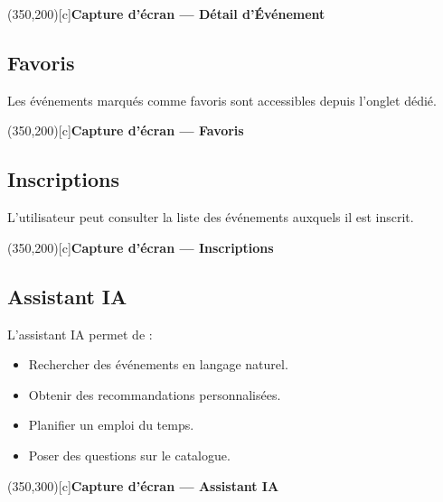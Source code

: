 \documentclass[12pt,a4paper]{article}
\begin{document}
\vspace{0.5cm}
\begin{center}
    \framebox(350,200)[c]{\textbf{Capture d'écran --- Détail d'Événement}}
\end{center}
\vspace{0.3cm}

\subsection{Favoris}

Les événements marqués comme favoris sont accessibles depuis l'onglet dédié.

\vspace{0.5cm}
\begin{center}
    \framebox(350,200)[c]{\textbf{Capture d'écran --- Favoris}}
\end{center}
\vspace{0.3cm}

\subsection{Inscriptions}

L'utilisateur peut consulter la liste des événements auxquels il est inscrit.

\vspace{0.5cm}
\begin{center}
    \framebox(350,200)[c]{\textbf{Capture d'écran --- Inscriptions}}
\end{center}
\vspace{0.3cm}

\subsection{Assistant IA}

L'assistant IA permet de :
\begin{itemize}
    \item Rechercher des événements en langage naturel.
    \item Obtenir des recommandations personnalisées.
    \item Planifier un emploi du temps.
    \item Poser des questions sur le catalogue.
\end{itemize}

\vspace{0.5cm}
\begin{center}
    \framebox(350,300)[c]{\textbf{Capture d'écran --- Assistant IA}}
\end{center}
\vspace{0.3cm}
\end{document}
